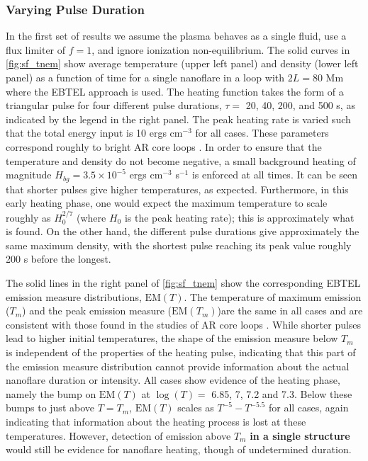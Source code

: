 \documentclass[iop]{emulateapj}
\begin{document}
	\subsubsection{Varying Pulse Duration}
	\label{subsubsec:pulse_res}
		\par In the first set of results we assume the plasma behaves as a single fluid, use a flux limiter of $f=1$, and ignore ionization non-equilibrium. The solid curves in \autoref{fig:sf_tnem} show average temperature (upper left panel) and density (lower left panel) as a function of time for a single nanoflare in a loop with $2L = 80$ Mm where the EBTEL approach is used.  The heating function takes the form of a triangular pulse for four different pulse durations, $\tau=$ 20, 40, 200, and 500 s, as indicated by the legend in the right panel. The peak heating rate is varied such that the total energy input is 10 ergs cm$^{-3}$ for all cases. These parameters correspond roughly to bright AR core loops \citep{warren_systematic_2012}. In order to ensure that the temperature and density do not become negative, a small background heating of magnitude $H_{bg}=3.5\times10^{-5}$ ergs cm$^{-3}$ s$^{-1}$ is enforced at all times. It can be seen that shorter pulses give higher temperatures, as expected. Furthermore, in this early heating phase, one would expect the maximum temperature to scale roughly as $H_0^{2/7}$ (where $H_0$ is the peak heating rate); this is approximately what is found. On the other hand, the different pulse durations give approximately the same maximum density, with the shortest pulse reaching its peak value roughly 200 s before the longest. 
		\par The solid lines in the right panel of \autoref{fig:sf_tnem} show the corresponding EBTEL emission measure distributions, $\mathrm{EM}(T)$. The temperature of maximum emission ($T_m$) and the peak emission measure ($\mathrm{EM}(T_m)$)are the same in all cases and are consistent with those found in the studies of AR core loops \citep[e.g.][]{warren_systematic_2012}. While shorter pulses lead to higher initial temperatures, the shape of the emission measure below $T_m$ is independent of the properties of the heating pulse, indicating that this part of the emission measure distribution cannot provide information about the actual nanoflare duration or intensity. All cases show evidence of the heating phase, namely the bump on $\mathrm{EM}(T)$ at $\log{(T)} =$ 6.85, 7, 7.2 and 7.3. Below these bumps to just above $T = T_m$, $\mathrm{EM}(T)$ scales as $T^{-5}-T^{-5.5}$ for all cases, again indicating that information about the heating process is lost at these temperatures. However, detection of emission above $T_m$ \textbf{in a single structure} would still be evidence for nanoflare heating, though of undetermined duration.  
\end{document}
